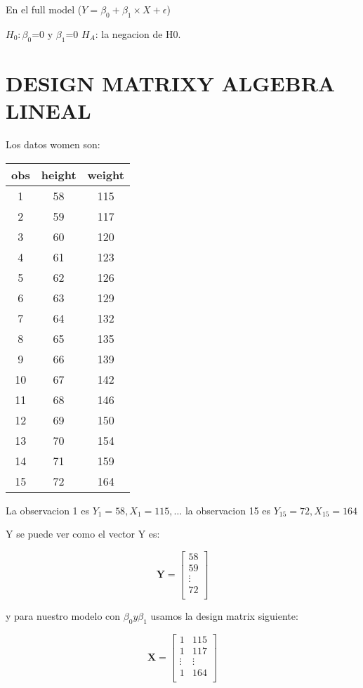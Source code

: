 \documentclass[letterpaper,11pt]{article}\usepackage[]{graphicx}\usepackage[]{color}
\begin{document}
\begin{itemization}
{En el full model ($Y= \beta_{0} + \beta_{1} \times X + \epsilon$)

$H_{0}: \beta_{0}$=0 y $\beta_{1}$=0
$H_{A}$: la negacion de H0.

\section{DESIGN MATRIXY ALGEBRA LINEAL}
Los datos women son:

\begin{center}
 \begin{tabular}{||c c c||} 
 \hline
 obs & height & weight \\ [0.5ex] 
 \hline\hline
 1  &  58  &  115 \\ [0.5ex] 
 2  &  59  &  117 \\
 3  &  60  &  120 \\
 4  &  61  &  123 \\
 5  &  62  &  126 \\
 6  &  63  &  129 \\
 7  &  64  &  132 \\
 8  &  65  &  135 \\
 9  &  66  &  139 \\
10  &  67  &  142 \\
11  &  68  &  146 \\
12  &  69  &  150 \\
13  &  70  &  154 \\
14  &  71  &  159 \\
15  &  72  &  164 \\ [1ex] 
 \hline
\end{tabular}
\end{center}



La observacion 1 es $Y_{1}=58, X_{1}=115, \ldots$ la observacion 15 es $Y_{15}=72, X_{15}= 164$

Y se puede ver como el vector Y es:

	\[\pmb{Y}=
	\begin{bmatrix}
	58  \\
	59  \\
	\vdots \\
	72 	\\
	\end{bmatrix}
	\] 


y para nuestro modelo con $\beta_{0} y \beta_{1}$ usamos la design matrix siguiente:


	\[\pmb{X}=
	\begin{bmatrix}
	1 			& 115 	\\
	1 			& 117 	\\
	\vdots 	& \vdots  \\
	1 			& 164 	\\
	\end{bmatrix}
	\]
\\ \\

}
\end{itemization}
\end{document}
